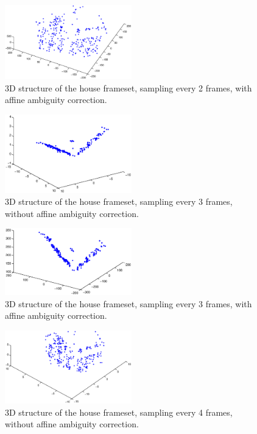 \begin{figure}[ht!]
  \centering
    \includegraphics[width=0.49\textwidth]{figures/2-22.eps}
    \caption{3D structure of the house frameset, sampling every 2 frames, with affine ambiguity correction.}
    \label{fig:icp2-22}
\end{figure}

\begin{figure}[ht!]
  \centering
    \includegraphics[width=0.49\textwidth]{figures/housegood.eps}
    \caption{3D structure of the house frameset, sampling every 3 frames, without affine ambiguity correction.}
    \label{fig:icp3}
\end{figure}


\begin{figure}[ht!]
  \centering
    \includegraphics[width=0.49\textwidth]{figures/housegoodaffine.eps}
    \caption{3D structure of the house frameset, sampling every 3 frames, with affine ambiguity correction.}
    \label{fig:icp3aff}
\end{figure}



\begin{figure}[ht!]
  \centering
    \includegraphics[width=0.49\textwidth]{figures/4-11amb.eps}
    \caption{3D structure of the house frameset, sampling every 4 frames, without affine ambiguity correction.}
    \label{fig:icp4-11-Amb}
\end{figure}

